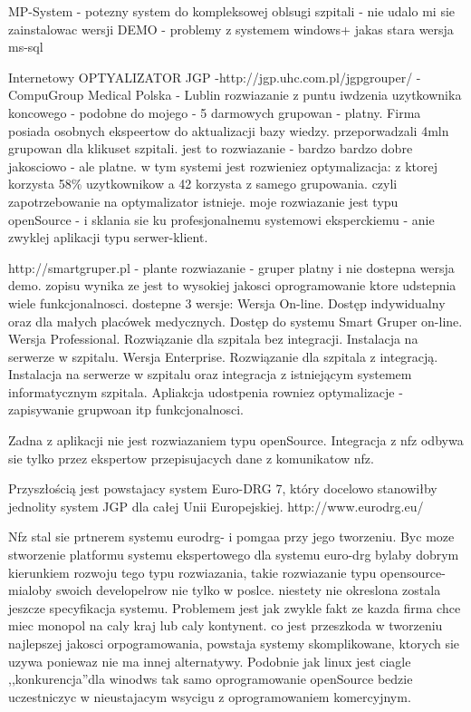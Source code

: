 MP-System - potezny system do kompleksowej oblsugi szpitali - nie udalo mi sie zainstalowac wersji DEMO - problemy z systemem windows+ jakas stara wersja ms-sql

Internetowy OPTYALIZATOR JGP -http://jgp.uhc.com.pl/jgpgrouper/ - CompuGroup Medical Polska - Lublin
rozwiazanie z puntu iwdzenia uzytkownika koncowego - podobne do mojego - 5 darmowych grupowan - platny. Firma posiada osobnych ekspeertow do aktualizacji bazy wiedzy. przeporwadzali 4mln grupowan dla klikuset szpitali. jest to rozwiazanie - bardzo bardzo dobre jakosciowo - ale platne.
w tym systemi jest rozwieniez optymalizacja: z ktorej korzysta 58\% uzytkownikow a 42\5 korzysta z samego grupowania. czyli zapotrzebowanie na optymalizator istnieje. moje rozwiazanie jest typu openSource - i sklania sie ku profesjonalnemu systemowi eksperckiemu - anie zwyklej aplikacji typu serwer-klient.


http://smartgruper.pl - plante rozwiazanie - gruper platny i nie dostepna wersja demo. zopisu wynika ze jest to wysokiej jakosci oprogramowanie ktore udstepnia wiele funkcjonalnosci. dostepne 3 wersje:
Wersja On-line. Dostęp indywidualny oraz dla małych placówek medycznych. Dostęp do systemu Smart Gruper on-line.
Wersja Professional. Rozwiązanie dla szpitala bez integracji. Instalacja na serwerze w szpitalu.
Wersja Enterprise. Rozwiązanie dla szpitala z integracją. Instalacja na serwerze w szpitalu oraz integracja z istniejącym systemem informatycznym szpitala. Apliakcja udostpenia rowniez optymalizacje - zapisywanie grupwoan itp funkcjonalnosci.

Zadna z aplikacji nie jest rozwiazaniem typu openSource. Integracja z nfz odbywa sie tylko przez ekspertow przepisujacych dane z komunikatow nfz. 

Przyszłością jest powstajacy system Euro-DRG 7, który docelowo stanowiłby jednolity system JGP dla całej Unii Europejskiej.
http://www.eurodrg.eu/

Nfz stal sie prtnerem systemu eurodrg- i pomgaa przy jego tworzeniu. Byc moze stworzenie platformu systemu ekspertowego dla systemu euro-drg bylaby dobrym kierunkiem rozwoju tego typu rozwiazania, takie rozwiazanie typu opensource- mialoby swoich developelrow nie tylko w poslce. niestety nie okreslona zostala jeszcze specyfikacja systemu. Problemem jest jak zwykle fakt ze kazda firma chce miec monopol na caly kraj lub caly kontynent. co jest przeszkoda w tworzeniu najlepszej jakosci orpogramowania, powstaja systemy skomplikowane, ktorych sie uzywa poniewaz nie ma innej alternatywy. Podobnie jak linux jest ciagle ,,konkurencja''dla winodws tak samo oprogramowanie openSource bedzie uczestniczyc w nieustajacym wsycigu z oprogramowaniem komercyjnym. 

